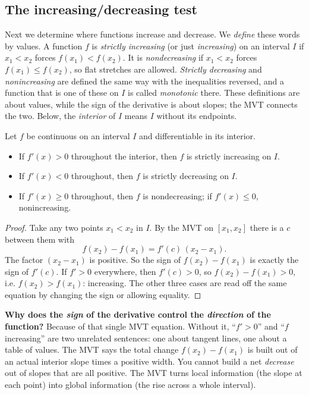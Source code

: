\subsection{The increasing/decreasing test}

Next we determine where functions increase and decrease.
We \emph{define} these words by values. A function $f$ is \emph{strictly increasing}
(or just \emph{increasing}) on an interval $I$ if $x_1<x_2$ forces $f(x_1)<f(x_2)$.
It is \emph{nondecreasing} if $x_1<x_2$ forces $f(x_1)\le f(x_2)$, so flat stretches are
allowed. \emph{Strictly decreasing} and \emph{nonincreasing} are defined the same way
with the inequalities reversed, and a function that is one of these on $I$ is called
\emph{monotonic} there. These definitions are about values, while the sign of the
derivative is about slopes; the MVT connects the two. Below, the \emph{interior} of $I$ means $I$
without its endpoints.

\begin{theorem}\label{ch15:thm-mono}
Let $f$ be continuous on an interval $I$ and differentiable in its interior.
\begin{itemize}
\item If $f'(x)>0$ throughout the interior, then $f$ is strictly increasing on $I$.
\item If $f'(x)<0$ throughout, then $f$ is strictly decreasing on $I$.
\item If $f'(x)\ge 0$ throughout, then $f$ is nondecreasing; if $f'(x)\le 0$,
nonincreasing.
\end{itemize}
\end{theorem}

\begin{proof}
Take any two points $x_1<x_2$ in $I$. By the MVT on $[x_1,x_2]$ there is a $c$
between them with
\[
  f(x_2)-f(x_1)=f'(c)\,(x_2-x_1).
\]
The factor $(x_2-x_1)$ is positive. So the sign of $f(x_2)-f(x_1)$ is exactly the
sign of $f'(c)$. If $f'>0$ everywhere, then $f'(c)>0$, so $f(x_2)-f(x_1)>0$, i.e.
$f(x_2)>f(x_1)$: increasing. The other three cases are read off the same equation by
changing the sign or allowing equality.
\end{proof}

\begin{whybox}
\textbf{Why does the \emph{sign} of the derivative control the \emph{direction} of
the function?} Because of that single MVT equation. Without it, ``$f'>0$'' and
``$f$ increasing'' are two unrelated sentences: one about tangent lines, one
about a table of values. The MVT says the total change $f(x_2)-f(x_1)$ is built out
of an actual interior slope times a positive width. You cannot build a net
\emph{decrease} out of slopes that are all positive. The MVT turns local information
(the slope at each point) into global information (the rise across a whole
interval).
\end{whybox}

